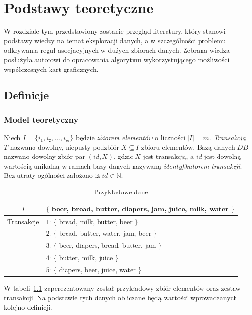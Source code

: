
\chapter{Podstawy teoretyczne}

W rozdziale tym przedstawiony zostanie przegląd literatury, który stanowi podstawy wiedzy na temat eksploracji danych, a w szczególności problemu odkrywania reguł asocjacyjnych w dużych zbiorach danych. Zebrana wiedza posłużyła autorowi do opracowania algorytmu wykorzystującego możliwości współczesnych kart graficznych.

\section{Definicje}

\subsection{Model teoretyczny}

Niech $I = \lbrace i_1,i_2,...,i_m \rbrace$ będzie \emph{zbiorem elementów} o liczności $|I| = m$. \emph{Transakcją} $T$ nazwano dowolny, niepusty podzbiór $X \subseteq I$ zbioru elementów. Bazą danych $DB$ nazwano dowolny zbiór par $(id, X)$, gdzie $X$ jest transakcją, a $id$ jest dowolną wartością unikalną w ramach bazy danych nazywaną \emph{identyfikatorem transakcji}. Bez utraty ogólności założono iż $id\in \mathbb{N}$. 

\begin{table}
	\centering
	\begin{tabular}{|c|l|} \hline
	$I$ & $\lbrace$ beer, bread, butter, diapers, jam, juice, milk, water $\rbrace$ \\ \hline
	Transakcje & $1$: $\lbrace$ bread, milk, butter, beer $\rbrace$ \\
	 & $2$:  $\lbrace$ bread, butter, water, jam, beer $\rbrace$ \\ 
	 & $3$:  $\lbrace$ beer, diapers, bread, butter, jam $\rbrace$ \\ 
	 & $4$:  $\lbrace$ butter, milk, juice $\rbrace$ \\
	 & $5$:  $\lbrace$ diapers, beer, juice, water $\rbrace$ \\ \hline
	\end{tabular}
	\caption{Przykładowe dane\label{example:data}}
\end{table}

W tabeli~\ref{example:data} zaperezentowany został przykładowy zbiór elementów oraz zestaw transakcji. Na podstawie tych danych obliczane będą wartości wprowadzanych kolejno definicji.

